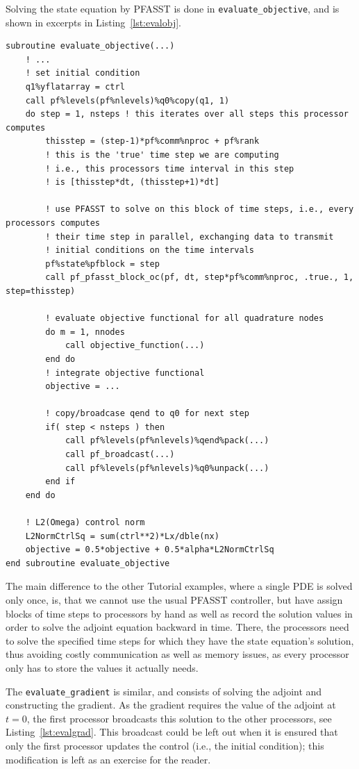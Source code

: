 \documentclass[a4paper]{article} %
\begin{document}
Solving the state equation by PFASST is done in \lstinline|evaluate_objective|, and is shown in excerpts in Listing~\ref{lst:evalobj}.
\begin{lstlisting}[frame=tb,caption={\lstinline|evalute_objective| from \lstinline|pf_optimization_1d.f90|},label=lst:evalobj]
subroutine evaluate_objective(...)
	! ...
	! set initial condition
	q1%yflatarray = ctrl
	call pf%levels(pf%nlevels)%q0%copy(q1, 1) 
	do step = 1, nsteps ! this iterates over all steps this processor computes
		thisstep = (step-1)*pf%comm%nproc + pf%rank  
		! this is the 'true' time step we are computing 
		! i.e., this processors time interval in this step
		! is [thisstep*dt, (thisstep+1)*dt]
		
		! use PFASST to solve on this block of time steps, i.e., every processors computes 
		! their time step in parallel, exchanging data to transmit
		! initial conditions on the time intervals
		pf%state%pfblock = step    
		call pf_pfasst_block_oc(pf, dt, step*pf%comm%nproc, .true., 1, step=thisstep)
		
		! evaluate objective functional for all quadrature nodes
		do m = 1, nnodes
			call objective_function(...)
		end do
		! integrate objective functional 
		objective = ...
		
		! copy/broadcase qend to q0 for next step
		if( step < nsteps ) then
			call pf%levels(pf%nlevels)%qend%pack(...)   
			call pf_broadcast(...)
			call pf%levels(pf%nlevels)%q0%unpack(...)   
		end if
	end do
	
	! L2(Omega) control norm
	L2NormCtrlSq = sum(ctrl**2)*Lx/dble(nx)
    objective = 0.5*objective + 0.5*alpha*L2NormCtrlSq
end subroutine evaluate_objective
\end{lstlisting}
The main difference to the other Tutorial examples, where a single PDE is solved only once, is, that we cannot use the usual PFASST controller, but have assign blocks of time steps to processors by hand as well as record the solution values in order to solve the adjoint equation backward in time. There, the processors need to solve the specified time steps for which they have the state equation's solution, thus avoiding costly communication as well as memory issues, as every processor only has to store the values it actually needs.

The \lstinline|evaluate_gradient| is similar, and consists of solving the adjoint and constructing the gradient. As the gradient requires the value of the adjoint at $t=0$, the first processor broadcasts this solution to the other processors, see Listing~\ref{lst:evalgrad}. This broadcast could be left out when it is ensured that only the first processor updates the control (i.e., the initial condition); this modification is left as an exercise for the reader.
\end{document}

